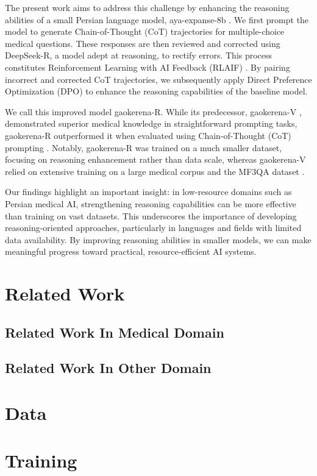 \documentclass[conference]{IEEEtran}
\begin{document}
The present work aims to address this challenge by enhancing the reasoning abilities of a small Persian language model, aya-expanse-8b
\cite{b5}. We first prompt the model to generate Chain-of-Thought (CoT) trajectories for multiple-choice medical questions. These responses are then reviewed and corrected using DeepSeek-R, a model adept at reasoning, to rectify errors. This process constitutes Reinforcement Learning with AI Feedback (RLAIF)
\cite{b6}. By pairing incorrect and corrected CoT trajectories, we subsequently apply Direct Preference Optimization (DPO)
\cite{b7} to enhance the reasoning capabilities of the baseline model.

We call this improved model gaokerena-R. While its predecessor, gaokerena-V
\cite{b8}, demonstrated superior medical knowledge in straightforward prompting tasks, gaokerena-R outperformed it when evaluated using Chain-of-Thought (CoT) prompting
\cite{b9}. Notably, gaokerena-R was trained on a much smaller dataset, focusing on reasoning enhancement rather than data scale, whereas gaokerena-V relied on extensive training on a large medical corpus and the MF3QA dataset
\cite{b8}.

Our findings highlight an important insight: in low-resource domains such as Persian medical AI, strengthening reasoning capabilities can be more effective than training on vast datasets. This underscores the importance of developing reasoning-oriented approaches, particularly in languages and fields with limited data availability. By improving reasoning abilities in smaller models, we can make meaningful progress toward practical, resource-efficient AI systems.
	
	\section{Related Work}
	\subsection{Related Work In Medical Domain}
         \subsection{Related Work In Other Domain}


         \section{Data}


           \section{Training}
\end{document}
